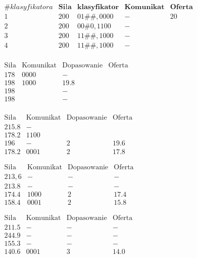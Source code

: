 \documentclass{article}
\begin{document}
		\begin{center}
		
	$	\begin{array}{cccccccccc}
			\# klasyfikatora  & \textbf{Siła} & \textbf{klasyfikator} & \textbf{Komunikat} &  \textbf{Oferta} \\
			1 & 200 & 01\#\#,0000  & - & 20 \\ 
			2 & 200 &  00\#0,1100 & - &  & \\
			3 & 200 &  11\#\#,1000 & - &  & \\  
			4 & 200 &  11\#\#,1000 & - &  & \\
		\end{array} $
		
		$\begin{array}{cccc}
		\text{Siła} & \text{Komunikat} & \text{Dopasowanie} & \text{Oferta }\\ 
		 178 & 0000 & -   \\ 
		 198 &  1000 & 19.8 \\ 
		 198 &  & -   \\ 
		 198 &  & -   \\ 
		\end{array} $
		
		
	$	\begin{array}{cccc}
		\text{Siła} & \text{Komunikat} & \text{Dopasowanie} & \text{Oferta }\\ 
			215.8 & - &  &  \\ 
			178.2 & 1100 &  &  \\ 
			196 & - & 2 & 19.6 \\ 
			178.2 & 0001 & 2 & 17.8
		\end{array} $
		
	$	\begin{array}{cccc}
		\text{Siła} & \text{Komunikat} & \text{Dopasowanie} & \text{Oferta }\\ 
			213,6 & - & - & - \\ 
			213.8 & - & - & - \\ 
			174.4 & 1000 & 2 & 17.4 \\ 
			158.4 & 0001 & 2 & 15.8
		\end{array} $
		
		$\begin{array}{cccc}
		\text{Siła} & \text{Komunikat} & \text{Dopasowanie} & \text{Oferta }\\ 
					211.5 & - & - & - \\ 
					244.9 & - & - & - \\ 
					155.3 & - & - & - \\ 
					140.6 & 0001 & 3 & 14.0
				\end{array} $
				
		\end{center}
		
\end{document}
